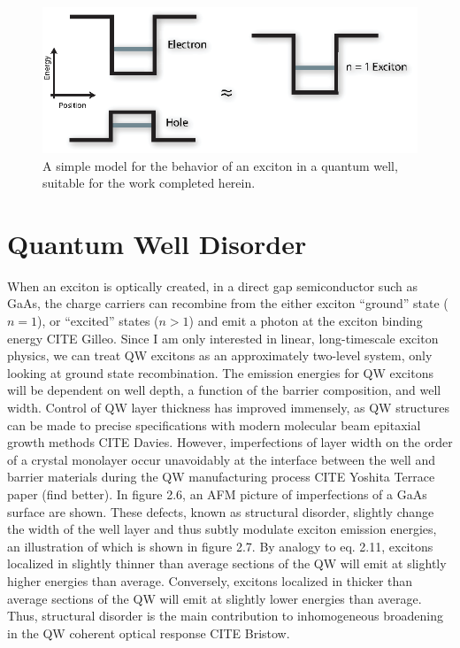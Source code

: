\begin{figure}[h!]
\label{Spapprox}
\centering
\includegraphics[width = .7\textwidth]{SpApprox.eps}
\caption{\doublespacing A simple model for the behavior of an exciton in a quantum well, suitable for the work completed herein.}
\label{GaAsBstruct}
\end{figure}


\section{Quantum Well Disorder}
\indent When an exciton is optically created, in a direct gap semiconductor such as GaAs, the charge carriers can recombine from the either exciton ``ground'' state ($n=1$), or ``excited''  states ($n>1$) and emit a photon at the exciton binding energy CITE Gilleo. Since I am only interested in linear, long-timescale exciton physics, we can treat QW excitons as an approximately two-level system, only looking at ground state recombination. The emission energies for QW excitons will be dependent on well depth, a function of the barrier composition, and well width. Control of QW layer thickness has improved immensely, as QW structures can be made to precise specifications with modern molecular beam epitaxial growth methods CITE Davies. However, imperfections of layer width on the order of a crystal monolayer occur unavoidably at the interface between the well and barrier materials during the QW manufacturing process CITE Yoshita Terrace paper (find better). In figure 2.6, an AFM picture of imperfections of a GaAs surface are shown. These defects, known as structural disorder, slightly change the width of the well layer and thus subtly modulate exciton emission energies, an illustration of which is shown in figure 2.7. By analogy to eq. 2.11, excitons localized in slightly thinner than average sections of the QW will emit at slightly higher energies than average. Conversely, excitons localized in thicker than average sections of the QW will emit at slightly lower energies than average. Thus, structural disorder is the main contribution to inhomogeneous broadening in the QW coherent optical response CITE Bristow. 


